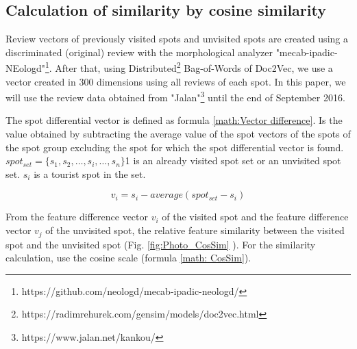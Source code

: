 \documentclass[journal]{IAENGtran}
\begin{document}
\subsection{Calculation of similarity by cosine similarity}
\label{subsec:Calculation of similarity by cosine similarity}
Review vectors of previously visited spots and unvisited spots are created using a discriminated (original) review with the morphological analyzer "mecab-ipadic-NEologd"\footnote{https://github.com/neologd/mecab-ipadic-neologd/}.
After that, using Distributed\footnote{https://radimrehurek.com/gensim/models/doc2vec.html} Bag-of-Words of Doc2Vec, we use a vector created in 300 dimensions using all reviews of each spot.
In this paper, we will use the review data obtained from "Jalan"\footnote{https://www.jalan.net/kankou/} until the end of September 2016.

The spot differential vector is defined as formula \ref{math:Vector difference}.
Is the value obtained by subtracting the average value of the spot vectors of the spots of the spot group excluding the spot for which the spot differential vector is found.
$spot_{set} =\{s_1,s_2,\dots,s_i,\dots,s_n\}$1 is an already visited spot set or an unvisited spot set.
$s_i$ is a tourist spot in the set.

\begin{equation}
  v_i=s_i-average(spot_{set}-s_i)
    \label{math:Vector difference}
\end{equation}

From the feature difference vector $v_i$ of the visited spot and the feature difference vector $v_j$ of the unvisited spot, the relative feature similarity between the visited spot and the unvisited spot (Fig. \ref{fig:Photo_CosSim} ).
For the similarity calculation, use the cosine scale (formula \ref{math: CosSim}).
\end{document}
